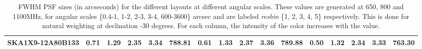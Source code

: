 \begin{table}[htp]
{{\begin{tabular}{|lccccc||ccccc||ccccc|}
SKA1X9-12A80B133 & 0.71 \cellcolor{blue!29.63} & 1.29 \cellcolor{red!46.64} & 2.35 \cellcolor{green!30.89} & 3.34 \cellcolor{orange!31.29} & 788.81 \cellcolor{purple!25.73} & 0.61 \cellcolor{blue!20.31} & 1.33 \cellcolor{red!59.47} & 2.37 \cellcolor{green!60.00} & 3.36 \cellcolor{orange!60.00} & 789.88 \cellcolor{purple!48.31} & 0.50 \cellcolor{blue!18.00} & 1.32 \cellcolor{red!36.43} & 2.34 \cellcolor{green!18.00} & 3.33 \cellcolor{orange!18.00} & 763.30 \cellcolor{purple!60.00}\\ \hline 
\end{tabular}}
\vspace{-0.300000cm}
\hfill
\caption{FWHM PSF sizes (in arcseconds) for the different layouts at different angular scales. These values are generated at 650,
800 and 1100MHz, for angular scales \{0.4-1, 1-2, 2-3, 3-4, 600-3600\} arcsec and are labeled {\it resbin} \{1, 2, 3, 4, 5\}
respectively. This is done for natural weighting at declination -30 degrees. For each column, the intensity of the
color increases with the value.}\label{tab:psf_mean}}
 \end{table}
